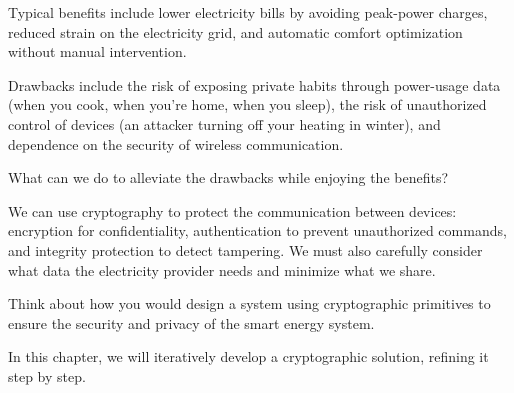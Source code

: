 Typical benefits include lower electricity bills by avoiding peak-power
charges,
reduced strain on the electricity grid, and automatic comfort optimization
without manual intervention.

Drawbacks include the risk of exposing private habits through power-usage
data (when you cook, when you're home, when you sleep), the risk of
unauthorized control of devices (an attacker turning off your heating in
winter), and dependence on the security of wireless communication.

\begin{exercise}\label{EnergyAlleviateDrawbacks}
  What can we do to alleviate the drawbacks while enjoying the benefits?
\end{exercise}

We can use cryptography to protect the communication between devices:
encryption for confidentiality, authentication to prevent unauthorized
commands, and integrity protection to detect tampering.
We must also carefully consider what data the electricity provider needs and
minimize what we share.

\begin{exercise}
  Think about how you would design a system using cryptographic primitives to
  ensure the security and privacy of the smart energy system.
\end{exercise}


In this chapter, we will iteratively develop a cryptographic solution,
refining it step by step.
\chapterminitoc


